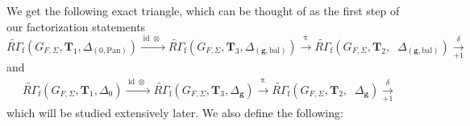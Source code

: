 \documentclass[10pt]{amsart}
\numberwithin{equation}{section}
\theoremstyle{definition}
\theoremstyle{remark} %
\newcommand{\pan}{\mathrm{Pan}}
\DeclareMathOperator{\tr}{{tr}^*}
\renewcommand{\b}{\mathrm{bal}}
\newcommand{\g}{\mathbf{g}}
\newcommand{\T}{\mathbf{T}}
\begin{document}
	\subsubsection{}
	We get the following exact triangle, which can be thought of as the first step of our factorization statements
	\begin{equation}\label{comtriangle1}
		\widetilde{R\Gamma}_{\mathrm{f}}(G_{F,\Sigma},\T_{1}, \Delta_{(0,\pan)}) \xrightarrow{\operatorname{id} \otimes \tr}\widetilde{R\Gamma}_{\mathrm{f}}(G_{F,\Sigma},\T_{3}, \Delta_{(\g,\b)}) \xrightarrow{\operatorname{\pi_{\tr}}} \widetilde{R\Gamma}_{\mathrm{f}}(G_{F,\Sigma},\T_{2}, \tr \Delta_{(\g,\b)}) \xrightarrow[+1]{\delta}  
	\end{equation}
	and
	\begin{align}
		\label{comtriangle}
		\widetilde{R\Gamma}_{\mathrm{f}}(G_{F,\Sigma},\T_{1}, \Delta_{0}) \xrightarrow{\operatorname{id} \otimes \tr}\widetilde{R\Gamma}_{\mathrm{f}}(G_{F,\Sigma},\T_{3}, \Delta_{\g}) \xrightarrow{\operatorname{\pi_{\tr}}} \widetilde{R\Gamma}_{\mathrm{f}}(G_{F,\Sigma},\T_{2}, \tr \Delta_{\g}) \xrightarrow[+1]{\delta}
	\end{align}
	which will be studied extensively later. We also define the following:
\end{document}
